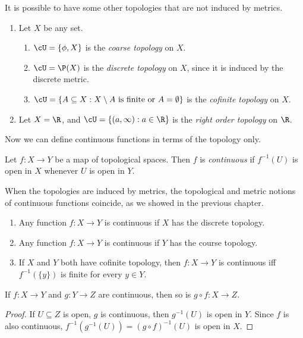 \documentclass[a4paper]{article}
\begin{document}
It is possible to have some other topologies that are not induced by metrics.
\begin{eg}\leavevmode
  \begin{enumerate}
    \item Let $X$ be any set.
      \begin{enumerate}
        \item $\cU = \{\phi, X\}$ is the \emph{coarse topology} on $X$.
        \item $\cU = \P(X)$ is the \emph{discrete topology} on $X$, since it is induced by the discrete metric.
        \item $\cU = \{A\subseteq X: X\setminus A\text{ is finite or } A = \emptyset\}$ is the \emph{cofinite topology} on $X$.
      \end{enumerate}
    \item Let $X = \R$, and $\cU = \{(a, \infty): a\in \R\}$ is the \emph{right order topology} on $\R$.
  \end{enumerate}
\end{eg}

Now we can define continuous functions in terms of the topology only.
\begin{defi}
  Let $f: X\to Y$ be a map of topological spaces. Then $f$ is \emph{continuous} if $f^{-1}(U)$ is open in $X$ whenever $U$ is open in $Y$.
\end{defi}
When the topologies are induced by metrics, the topological and metric notions of continuous functions coincide, as we showed in the previous chapter.

\begin{eg}\leavevmode
  \begin{enumerate}
    \item Any function $f: X\to Y$ is continuous if $X$ has the discrete topology.
    \item Any function $f: X\to Y$ is continuous if $Y$ has the course topology.
    \item If $X$ and $Y$ both have cofinite topology, then $f: X\to Y$ is continuous iff $f^{-1}(\{y\})$ is finite for every $y\in Y$.
  \end{enumerate}
\end{eg}

\begin{lemma}
  If $f: X\to Y$ and $g: Y\to Z$ are continuous, then so is $g\circ f: X\to Z$.
\end{lemma}

\begin{proof}
  If $U\subseteq Z$ is open, $g$ is continuous, then $g^{-1}(U)$ is open in $Y$. Since $f$ is also continuous, $f^{-1}(g^{-1}(U)) = (g\circ f)^{-1}(U)$ is open in $X$.
\end{proof}
\end{document}
